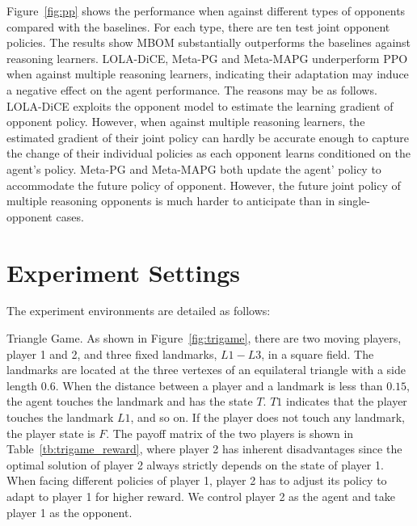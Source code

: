 \documentclass{article}
\begin{document}
Figure~\ref{fig:pp} shows the performance when against different types of opponents compared with the baselines. For each type, there are ten test joint opponent policies. The results show MBOM substantially outperforms the baselines against reasoning learners. 
LOLA-DiCE, Meta-PG and Meta-MAPG underperform PPO when against multiple reasoning learners, indicating their adaptation may induce a negative effect on the agent performance. The reasons may be as follows. LOLA-DiCE exploits the opponent model to estimate the learning gradient of opponent policy. However, when against multiple reasoning learners, the estimated gradient of their joint policy can hardly be accurate enough to capture the change of their individual policies as each opponent learns conditioned on the agent's policy. Meta-PG and Meta-MAPG both update the agent' policy to accommodate the future policy of opponent. However, the future joint policy of multiple reasoning opponents is much harder to anticipate than in single-opponent cases. 





\section{Experiment Settings}
\label{app:settings}

The experiment environments are detailed as follows:

\textsf{Triangle Game.} As shown in Figure~\ref{fig:trigame}, there are two moving players, player 1 and 2, and three fixed landmarks, $L1-L3$, in a square field. The landmarks are located at the three vertexes of an equilateral triangle with a side length $0.6$. When the distance between a player and a landmark is less than $0.15$, the agent touches the landmark and has the state $T$. $T1$ indicates that the player touches the landmark $L1$, and so on. If the player does not touch any landmark, the player state is $F$. The payoff matrix of the two players is shown in Table~\ref{tb:trigame_reward}, where player 2 has inherent disadvantages since the optimal solution of player 2 always strictly depends on the state of player 1. When facing different policies of player 1, player 2 has to adjust its policy to adapt to player 1 for higher reward. We control player 2 as the agent and take player 1 as the opponent.
\end{document}
